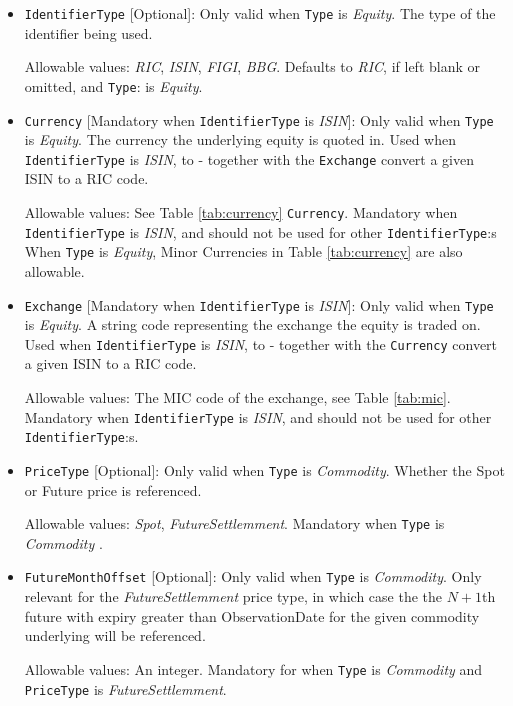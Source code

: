 \begin{itemize}
\item \lstinline!IdentifierType! [Optional]:
Only valid when \lstinline!Type! is  \emph{Equity}. The type of the identifier being used.  

Allowable values:  \emph{RIC}, \emph{ISIN}, \emph{FIGI}, \emph{BBG}. Defaults to \emph{RIC}, if left blank or omitted, and \lstinline!Type!: is  \emph{Equity}.

\item \lstinline!Currency! [Mandatory when \lstinline!IdentifierType! is  \emph{ISIN}]: Only valid when \lstinline!Type! is  \emph{Equity}. The currency the underlying equity is quoted in. Used when \lstinline!IdentifierType! is  \emph{ISIN}, to - together with the \lstinline!Exchange!  convert a given ISIN to a RIC code.  

Allowable values: See Table \ref{tab:currency} \lstinline!Currency!. Mandatory when \lstinline!IdentifierType! is  \emph{ISIN}, and should not be used for other  \lstinline!IdentifierType!:s  When \lstinline!Type! is \emph{Equity}, Minor Currencies in Table \ref{tab:currency} are also allowable.

\item \lstinline!Exchange! [Mandatory when \lstinline!IdentifierType! is  \emph{ISIN}]:
Only valid when \lstinline!Type! is  \emph{Equity}. A string code representing the exchange the equity is traded on. Used when \lstinline!IdentifierType! is  \emph{ISIN}, to - together with the \lstinline!Currency!  convert a given ISIN to a RIC code.  

Allowable values:  The MIC code of the exchange, see Table \ref{tab:mic}. Mandatory when \lstinline!IdentifierType! is  \emph{ISIN}, and should not be used for other  \lstinline!IdentifierType!:s.

\item \lstinline!PriceType! [Optional]:
Only valid when  \lstinline!Type! is  \emph{Commodity}.  Whether the Spot or Future price is referenced. 

Allowable values:  \emph{Spot}, \emph{FutureSettlemment}. Mandatory when  \lstinline!Type! is  \emph{Commodity} .

\item \lstinline!FutureMonthOffset! [Optional]:
Only valid when  \lstinline!Type! is  \emph{Commodity}. Only relevant for the \emph{FutureSettlemment} price type, in which case the the $N+1$th future with
  expiry greater than ObservationDate for the given commodity underlying will be referenced.

Allowable values:  An integer. Mandatory for when  \lstinline!Type! is  \emph{Commodity} and \lstinline!PriceType! is \emph{FutureSettlemment}.


\end{itemize}
